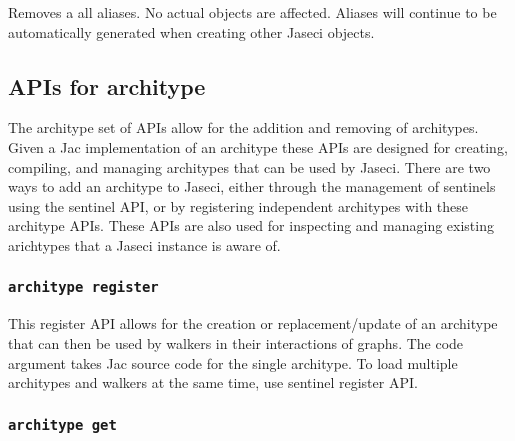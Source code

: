 {Removes a all aliases. No actual objects are affected. Aliases will
continue to be automatically generated when creating other Jaseci
objects.}
\subsection{APIs for architype}

\par
The architype set of APIs allow for the addition and removing of
architypes. Given a Jac implementation of an architype these APIs are
designed for creating, compiling, and managing architypes that can be
used by Jaseci. There are two ways to add an architype to Jaseci, either
through the management of sentinels using the sentinel API, or by
registering independent architypes with these architype APIs. These
APIs are also used for inspecting and managing existing arichtypes that
a Jaseci instance is aware of.

\subsubsection{\lstinline[basicstyle=\Large\ttfamily]$architype register$}

{This register API allows for the creation or replacement/update of
an architype that can then be used by walkers in their interactions
of graphs. The code argument takes Jac source code for the single
architype. To load multiple architypes and walkers at the same time,
use sentinel register API.\vspace{4mm}\par
{}}
\subsubsection{\lstinline[basicstyle=\Large\ttfamily]$architype get$}

